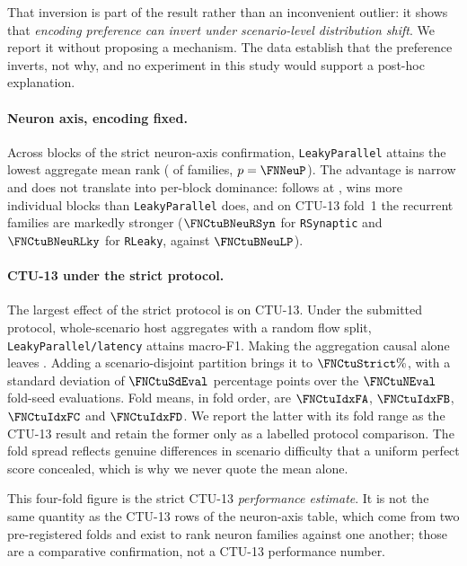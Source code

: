 That inversion is part of the result rather than an inconvenient outlier: it
shows that \emph{encoding preference can invert under scenario-level
distribution shift}. We report it without proposing a mechanism. The data
establish that the preference inverts, not why, and no experiment in this study
would support a post-hoc explanation.

\paragraph{Neuron axis, encoding fixed.}
Across \FNNeuBlocks{} blocks of the strict neuron-axis confirmation,
\texttt{LeakyParallel} attains the lowest aggregate mean rank
(\FNNeuRank{} of \FNNeuLevels{} families, $p=\FNNeuP$). The advantage is narrow
and does not translate into per-block dominance: \FNNeuRunnerUp{} follows at
\FNNeuRunnerUpRank, \FNNeuMostWins{} wins more individual blocks than
\texttt{LeakyParallel} does, and on CTU-13 fold~1 the recurrent families are
markedly stronger ($\FNCtuBNeuRSyn$ for \texttt{RSynaptic} and
$\FNCtuBNeuRLky$ for \texttt{RLeaky}, against $\FNCtuBNeuLP$).

\paragraph{CTU-13 under the strict protocol.}
The largest effect of the strict protocol is on CTU-13. Under the submitted
protocol, whole-scenario host aggregates with a random flow split, \texttt{LeakyParallel/latency} attains \FNCtuLegacy{} macro-F1. Making the
aggregation causal alone leaves \FNCtuCausalRandom. Adding a scenario-disjoint
partition brings it to $\mathbf{\FNCtuStrict\%}$, with a standard deviation of
$\FNCtuSdEval$ percentage points over the $\FNCtuNEval$ fold-seed evaluations.
Fold means, in fold order, are $\FNCtuIdxFA$, $\FNCtuIdxFB$, $\FNCtuIdxFC$ and
$\FNCtuIdxFD$. We report the latter with its fold range as
the CTU-13 result and retain the former only as a labelled protocol comparison.
The fold spread reflects genuine differences in scenario difficulty that a
uniform perfect score concealed, which is why we never quote the mean alone.

This four-fold figure is the strict CTU-13 \emph{performance estimate}. It is
not the same quantity as the CTU-13 rows of the neuron-axis table, which come
from two pre-registered folds and exist to rank neuron families against one
another; those are a comparative confirmation, not a CTU-13 performance number.

